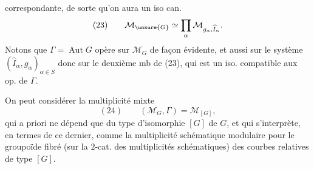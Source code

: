 correspondante,  de sorte qu'on aura un iso can.
\[
(23)\qquad\mathcal M_{\unsure{G}}\simeq\prod_\alpha\mathcal M_{g_\alpha,\widehat I_\alpha}.
\]
Notons que $\Gamma=\operatorname{Aut}G$ opère sur $\mathcal M_G$ de façon évidente, et aussi sur le système $(\widehat I_\alpha,g_\alpha)_{\alpha\in S}$ donc sur le deuxième mb de (23), qui est un iso. compatible aux op. de $\Gamma$.

On peut considérer la multiplicité mixte
\[
(24)\qquad(\mathcal M_G,\Gamma)=\mathcal M_{[G]},
\]
qui a priori ne dépend que du type d'isomorphie $[G]$ de $G$, et qui s'interprète, en termes de ce dernier, comme la multiplicité schématique modulaire pour le groupoïde fibré (sur la $2$-cat. des multiplicités schématiques) des courbes  relatives de type $[G]$.
